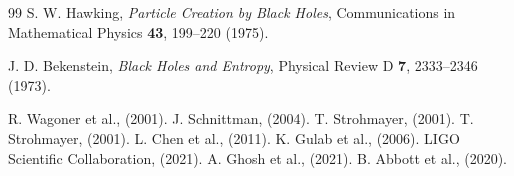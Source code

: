 \documentclass[11pt,a4paper]{article}
\begin{document}
\begin{thebibliography}{99}
		S. W. Hawking, \emph{Particle Creation by Black Holes}, Communications in Mathematical Physics \textbf{43}, 199–220 (1975).
		
		J. D. Bekenstein, \emph{Black Holes and Entropy}, Physical Review D \textbf{7}, 2333–2346 (1973).
		
		 R. Wagoner et al., (2001).
		 J. Schnittman, (2004).
		 T. Strohmayer, (2001).
		 T. Strohmayer, (2001).
		 L. Chen et al., (2011).
		 K. Gulab et al., (2006).
		 LIGO Scientific Collaboration, (2021).
		 A. Ghosh et al., (2021).
		 B. Abbott et al., (2020).
		
	\end{thebibliography}
	
\end{document}
